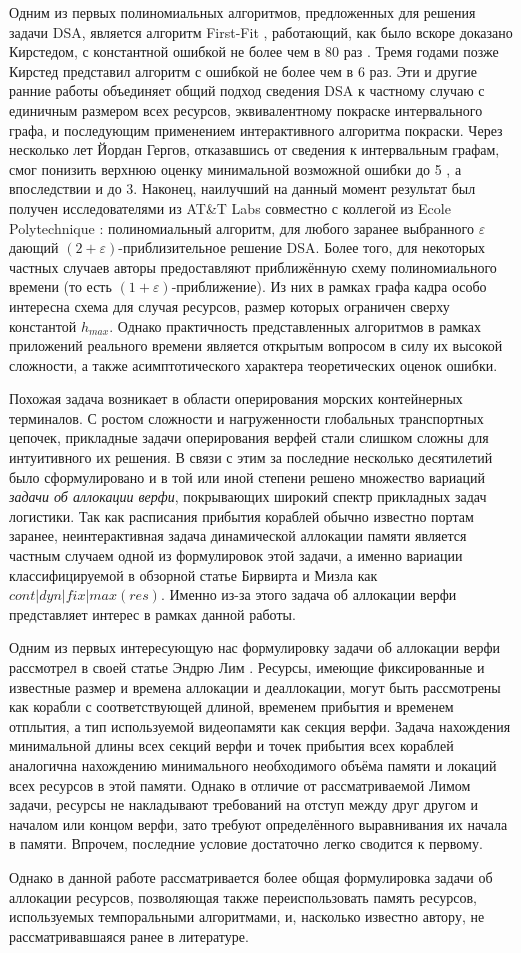 Одним из первых полиномиальных алгоритмов, предложенных для решения задачи DSA, является алгоритм First-Fit \cite{chrobak_packing_1988}, работающий, как было вскоре доказано Кирстедом, с константной ошибкой не более чем в 80 раз \cite{kierstead_linearity_1988}.
Тремя годами позже Кирстед представил алгоритм с ошибкой не более чем в 6 раз\cite{kierstead_polynomial_1991}.
Эти и другие ранние работы объединяет общий подход сведения DSA к частному случаю с единичным размером всех ресурсов, эквивалентному покраске интервального графа, и последующим применением интерактивного алгоритма покраски.
Через несколько лет Йордан Гергов, отказавшись от сведения к интервальным графам, смог понизить верхнюю оценку минимальной возможной ошибки до 5 \cite{gergov_approximation_1996}, а впоследствии и до 3\cite{gergov_algorithms_1999}.
Наконец, наилучший на данный момент результат был получен исследователями из AT\&T Labs совместно с коллегой из Ecole Polytechnique \cite{buchsbaum_opt_2003}: полиномиальный алгоритм, для любого заранее выбранного $\varepsilon$ дающий $(2+\varepsilon)$-приблизительное решение DSA.
Более того, для некоторых частных случаев авторы предоставляют приближённую схему полиномиального времени (то есть $(1+\varepsilon)$-приближение).
Из них в рамках графа кадра особо интересна схема для случая ресурсов, размер которых ограничен сверху константой $h_{max}$.
Однако практичность представленных алгоритмов в рамках приложений реального времени является открытым вопросом в силу их высокой сложности, а также асимптотического характера теоретических оценок ошибки.

Похожая задача возникает в области оперирования морских контейнерных терминалов.
С ростом сложности и нагруженности глобальных транспортных цепочек, прикладные задачи оперирования верфей стали слишком сложны для интуитивного их решения.
В связи с этим за последние несколько десятилетий было сформулировано и в той или иной степени решено множество вариаций \textit{задачи об аллокации верфи}, покрывающих широкий спектр прикладных задач логистики.
Так как расписания прибытия кораблей обычно известно портам заранее, неинтерактивная задача динамической аллокации памяти является частным случаем одной из формулировок этой задачи, а именно вариации классифицируемой в обзорной статье Бирвирта и Мизла \cite{BIERWIRTH2010615} как $cont|dyn|fix|max(res)$.
Именно из-за этого задача об аллокации верфи представляет интерес в рамках данной работы.

Одним из первых интересующую нас формулировку задачи об аллокации верфи рассмотрел в своей статье Эндрю Лим \cite{LIM1998105}.
Ресурсы, имеющие фиксированные и известные размер и времена аллокации и деаллокации, могут быть рассмотрены как корабли с соответствующей длиной, временем прибытия и временем отплытия, а тип используемой видеопамяти как секция верфи.
Задача нахождения минимальной длины всех секций верфи и точек прибытия всех кораблей аналогична нахождению минимального необходимого объёма памяти и локаций всех ресурсов в этой памяти.
Однако в отличие от рассматриваемой Лимом задачи, ресурсы не накладывают требований на отступ между друг другом и началом или концом верфи, зато требуют определённого выравнивания их начала в памяти.
Впрочем, последние условие достаточно легко сводится к первому.

Однако в данной работе рассматривается более общая формулировка задачи об аллокации ресурсов, позволяющая также переиспользовать память ресурсов, используемых темпоральными алгоритмами, и, насколько известно автору, не рассматривавшаяся ранее в литературе.
